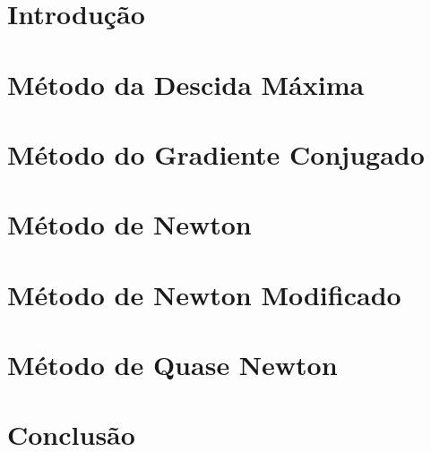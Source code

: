\documentclass{article}
\begin{document}
\large


\tableofcontents

\newpage

\section{Introdução}



\section{Método da Descida Máxima}\label{sec:descida_max}



\section{Método do Gradiente Conjugado}\label{sec:grad_conj}



\section{Método de Newton}\label{sec:newton}



\section{Método de Newton Modificado}\label{sec:newton_mod}



\section{Método de Quase Newton}\label{sec:quase_newton}



\section{Conclusão}


	


\end{document}
